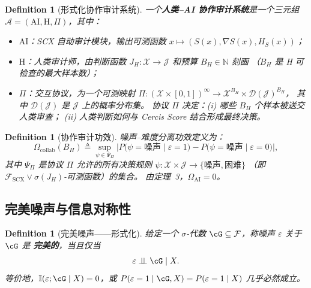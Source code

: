 \documentclass[12pt,a4paper]{article}
\newtheorem{definition}[theorem]{Definition}
\newcommand{\N}{\mathbb{N}}
\newcommand{\I}{\mathbb{I}}
\newcommand{\cX}{\mathcal{X}}
\newcommand{\cD}{\mathcal{D}}
\newcommand{\cA}{\mathcal{A}}
\newcommand{\cF}{\mathcal{F}}
\newcommand{\cJ}{\mathcal{J}}
\begin{document}
\begin{definition}[形式化协作审计系统]
\label{def:collab-system-formal}
一个\textbf{人类--AI 协作审计系统}是一个三元组
$\cA = (\mathrm{AI}, \mathrm{H}, \Pi)$，其中：
\begin{itemize}
    \item $\mathrm{AI}$：SCX 自动审计模块，输出可测函数
          $x \mapsto (S(x), \nabla S(x), H_S(x))$；
    \item $\mathrm{H}$：人类审计师，由判断函数
          $J_H: \cX \to \cJ$ 和预算 $B_H \in \N$ 刻画
          （$B_H$ 是 H 可检查的最大样本数）；
    \item $\Pi$：交互协议，为一个可测映射
          $\Pi: (\cX \times [0,1])^{\infty} \to \cX^{B_H} \times \cD(\cJ)^{B_H}$，
          其中 $\cD(\cJ)$ 是 $\cJ$ 上的概率分布集。
          协议 $\Pi$ 决定：(i) 哪些 $B_H$ 个样本被送交人类审查；
          (ii) 人类判断如何与 Cercis Score 结合形成最终决策。
\end{itemize}
\end{definition}

\begin{definition}[协作审计功效]
\label{def:omega-formal}
噪声--难度分离功效定义为：
\begin{equation}\label{eq:omega-formal}
    \Omega_{\mathrm{collab}}(B_H) \triangleq
    \sup_{\psi \in \Psi_{\Pi}} \Big|
        P\big(\psi = \text{噪声} \mid \varepsilon=1\big) -
        P\big(\psi = \text{噪声} \mid \varepsilon=0\big)
    \Big|,
\end{equation}
其中 $\Psi_{\Pi}$ 是协议 $\Pi$ 允许的所有决策规则 $\psi: \cX \times \cJ \to \{\text{噪声}, \text{困难}\}$
（即 $\cF_{\mathrm{SCX}} \vee \sigma(J_H)$-可测函数）的集合。
由定理~3，$\Omega_{\mathrm{AI}} = 0$。
\end{definition}

\subsection{完美噪声与信息对称性}

\begin{definition}[完美噪声——形式化]
\label{def:perfect-noise-formal}
给定一个 $\sigma$-代数 $\cG \subseteq \cF$，称噪声 $\varepsilon$ 关于 $\cG$ 是
\textbf{完美的}，当且仅当
\begin{equation}
    \varepsilon \perp\!\!\!\perp \cG \mid X.
\end{equation}
等价地，$\I(\varepsilon; \cG \mid X) = 0$，或 $P(\varepsilon=1 \mid \cG, X) = P(\varepsilon=1 \mid X)$
几乎必然成立。
\end{definition}
\end{document}
